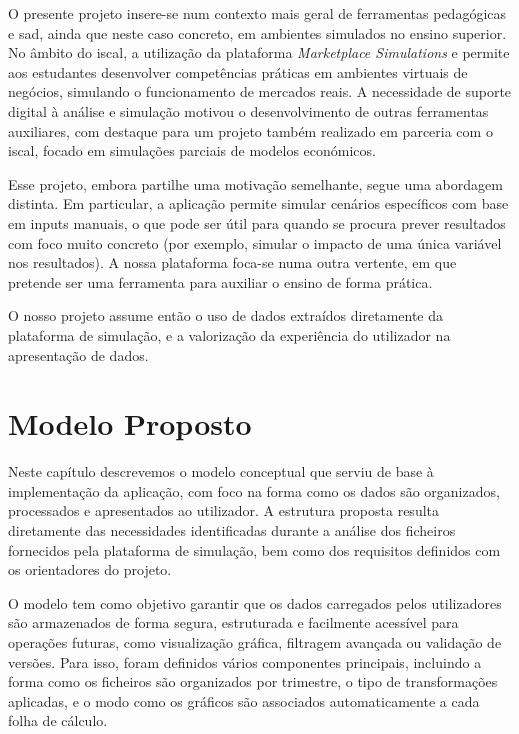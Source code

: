 O presente projeto insere-se num contexto mais geral de ferramentas pedagógicas e \gls{sad}, ainda que neste caso concreto, em ambientes simulados no ensino superior. No âmbito do \gls{iscal}, a utilização da plataforma \textit{Marketplace Simulations} e permite aos estudantes desenvolver competências práticas em ambientes virtuais de negócios, simulando o funcionamento de mercados reais. A necessidade de suporte digital à análise e simulação motivou o desenvolvimento de outras ferramentas auxiliares, com destaque para um projeto também realizado em parceria com o \gls{iscal}, focado em simulações parciais de modelos económicos.

Esse projeto, embora partilhe uma motivação semelhante, segue uma abordagem distinta. Em particular, a aplicação permite simular cenários específicos com base em inputs manuais, o que pode ser útil para quando se procura prever resultados com foco muito concreto (por exemplo, simular o impacto de uma única variável nos resultados). A nossa plataforma foca-se numa outra vertente, em que pretende ser uma ferramenta para auxiliar o ensino de forma prática.

O nosso projeto assume então o uso de dados extraídos diretamente da plataforma de simulação, e a valorização da experiência do utilizador na apresentação de dados. 

\chapter{Modelo Proposto}
\label{ch:modeloProposto}

Neste capítulo descrevemos o modelo conceptual que serviu de base à implementação da aplicação, com foco na forma como os dados são organizados, processados e apresentados ao utilizador. A estrutura proposta resulta diretamente das necessidades identificadas durante a análise dos ficheiros fornecidos pela plataforma de simulação, bem como dos requisitos definidos com os orientadores do projeto.

O modelo tem como objetivo garantir que os dados carregados pelos utilizadores são armazenados de forma segura, estruturada e facilmente acessível para operações futuras, como visualização gráfica, filtragem avançada ou validação de versões. Para isso, foram definidos vários componentes principais, incluindo a forma como os ficheiros são organizados por trimestre, o tipo de transformações aplicadas, e o modo como os gráficos são associados automaticamente a cada folha de cálculo.

